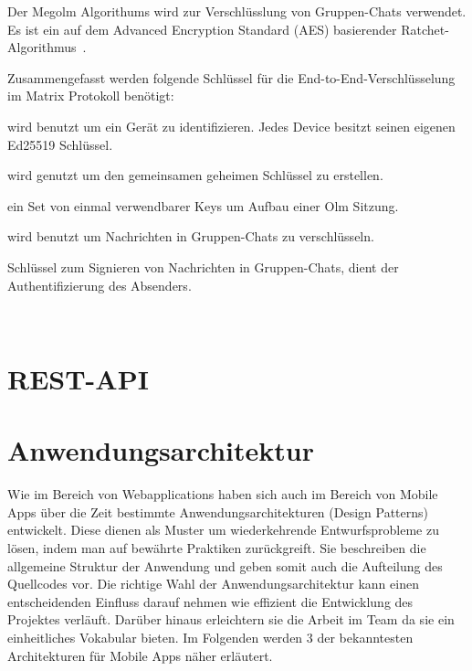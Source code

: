     Der Megolm Algorithums wird zur Verschlüsslung von Gruppen-Chats verwendet.
    Es ist ein auf dem Advanced Encryption Standard (AES) basierender Ratchet-Algorithmus~\cite{megolm}.

    Zusammengefasst werden folgende Schlüssel für die End-to-End-Verschlüsselung im Matrix Protokoll benötigt:
    \begin{description}[leftmargin=!,labelwidth=3cm]
        \item [Ed25519 fingerprint key pair] wird benutzt um ein Gerät zu identifizieren. Jedes Device besitzt seinen eigenen Ed25519 Schlüssel.
        \item [Curve25519 identity key pair] wird genutzt um den gemeinsamen geheimen Schlüssel zu erstellen.
        \item [Curve25519 one-time keys] ein Set von einmal verwendbarer Keys um Aufbau einer Olm Sitzung.
        \item [Megolm encryption keys] wird benutzt um Nachrichten in Gruppen-Chats zu verschlüsseln.
        \item [Ed25519 Megolm signing key pair] Schlüssel zum Signieren von Nachrichten in Gruppen-Chats, dient der Authentifizierung des Absenders.
    \end{description}
    ~\cite{matrix-end-to-end-encryption}



    \section{REST-API}\label{sec:rest}

    \cite{dazer2012restful}

    \newpage
    \section{Anwendungsarchitektur}\label{sec:anwendungsarchitektur}
    Wie im Bereich von Webapplications haben sich auch im Bereich von Mobile Apps über die Zeit bestimmte Anwendungsarchitekturen (Design Patterns) entwickelt.
    Diese dienen als Muster um wiederkehrende Entwurfsprobleme zu lösen, indem man auf bewährte Praktiken zurückgreift.
    Sie beschreiben die allgemeine Struktur der Anwendung und geben somit auch die Aufteilung des Quellcodes vor.
    Die richtige Wahl der Anwendungsarchitektur kann einen entscheidenden Einfluss darauf nehmen wie effizient die Entwicklung des Projektes verläuft.
    Darüber hinaus erleichtern sie die Arbeit im Team da sie ein einheitliches Vokabular bieten.
    Im Folgenden werden 3 der bekanntesten Architekturen für Mobile Apps näher erläutert.

